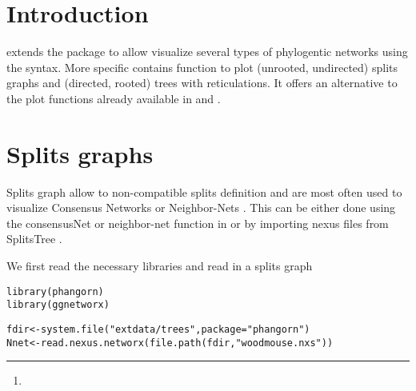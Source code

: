 \documentclass{article}\usepackage[]{graphicx}\usepackage[usenames,dvipsnames]{color}
\newcommand{\hlstr}[1]{\textcolor[rgb]{0.251,0.627,0.251}{#1}}%
\newcommand{\hlstd}[1]{\textcolor[rgb]{0.251,0.251,0.251}{#1}}%
\newcommand{\hlkwb}[1]{\textcolor[rgb]{0,0,0}{#1}}%
\newcommand{\hlkwc}[1]{\textcolor[rgb]{0.251,0.251,0.251}{#1}}%
\newcommand{\hlkwd}[1]{\textcolor[rgb]{0.878,0.439,0.125}{#1}}%
\newenvironment{knitrout}{}{} %
\begin{document}



\author{Klaus Schliep \thanks{}\\
University of Massachusetts Boston}

\maketitle

\tableofcontents

\newpage
\section{Introduction}
 extends the \cite{Yu2017} package to allow
visualize several types of phylogentic networks using the 
\cite{Wickham2016} syntax.
More specific  contains function
to plot (unrooted, undirected) splits graphs and (directed, rooted) trees with
reticulations. It offers an alternative to the plot functions already available
in  and .

\section{Splits graphs}
Splits graph allow to non-compatible splits definition and are most often
used to visualize Consensus Networks \cite{Holland2004} or Neighbor-Nets
\cite{Bryant2004}. This can be either done using the consensusNet or neighbor-net
function in \cite{Schliep2011} or by importing nexus files
from SplitsTree \cite{Huson2006}.

We first read the necessary libraries and read in a splits graph
\begin{knitrout}
\color{fgcolor}\begin{kframe}
\begin{alltt}
\hlkwd{library}\hlstd{(phangorn)}
\hlkwd{library}\hlstd{(ggnetworx)}
\end{alltt}


{\ttfamily\noindent\itshape\color{messagecolor}{\#\# Loading required package: ggplot2}}\begin{alltt}
\hlstd{fdir} \hlkwb{<-} \hlkwd{system.file}\hlstd{(}\hlstr{"extdata/trees"}\hlstd{,} \hlkwc{package} \hlstd{=} \hlstr{"phangorn"}\hlstd{)}
\hlstd{Nnet} \hlkwb{<-} \hlkwd{read.nexus.networx}\hlstd{(}\hlkwd{file.path}\hlstd{(fdir,}\hlstr{"woodmouse.nxs"}\hlstd{))}
\end{alltt}
\end{kframe}
\end{knitrout}
\end{document}
